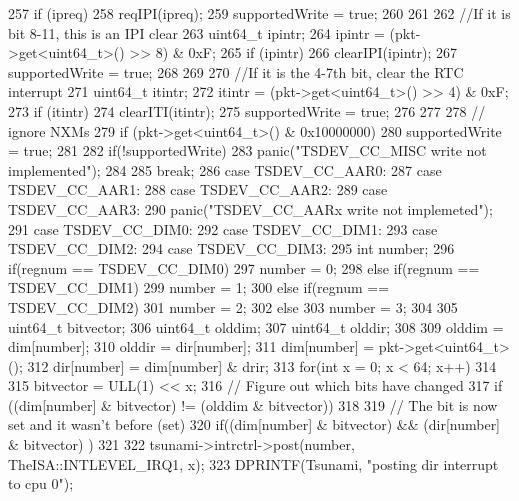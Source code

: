 \begin{DoxyCode}
{{{257             if (ipreq) {
258                 reqIPI(ipreq);
259                 supportedWrite = true;
260             }
261 
262             //If it is bit 8-11, this is an IPI clear
263             uint64_t ipintr;
264             ipintr = (pkt->get<uint64_t>() >> 8) & 0xF;
265             if (ipintr) {
266                 clearIPI(ipintr);
267                 supportedWrite = true;
268             }
269 
270             //If it is the 4-7th bit, clear the RTC interrupt
271             uint64_t itintr;
272               itintr = (pkt->get<uint64_t>() >> 4) & 0xF;
273             if (itintr) {
274                   clearITI(itintr);
275                 supportedWrite = true;
276             }
277 
278               // ignore NXMs
279               if (pkt->get<uint64_t>() & 0x10000000)
280                   supportedWrite = true;
281 
282             if(!supportedWrite)
283                   panic("TSDEV_CC_MISC write not implemented\n");
284 
285             break;
286             case TSDEV_CC_AAR0:
287             case TSDEV_CC_AAR1:
288             case TSDEV_CC_AAR2:
289             case TSDEV_CC_AAR3:
290                 panic("TSDEV_CC_AARx write not implemeted\n");
291             case TSDEV_CC_DIM0:
292             case TSDEV_CC_DIM1:
293             case TSDEV_CC_DIM2:
294             case TSDEV_CC_DIM3:
295                 int number;
296                 if(regnum == TSDEV_CC_DIM0)
297                     number = 0;
298                 else if(regnum == TSDEV_CC_DIM1)
299                     number = 1;
300                 else if(regnum == TSDEV_CC_DIM2)
301                     number = 2;
302                 else
303                     number = 3;
304 
305                 uint64_t bitvector;
306                 uint64_t olddim;
307                 uint64_t olddir;
308 
309                 olddim = dim[number];
310                 olddir = dir[number];
311                 dim[number] = pkt->get<uint64_t>();
312                 dir[number] = dim[number] & drir;
313                 for(int x = 0; x < 64; x++)
314                 {
315                     bitvector = ULL(1) << x;
316                     // Figure out which bits have changed
317                     if ((dim[number] & bitvector) != (olddim & bitvector))
318                     {
319                         // The bit is now set and it wasn't before (set)
320                         if((dim[number] & bitvector) && (dir[number] & bitvector)
      )
321                         {
322                           tsunami->intrctrl->post(number, TheISA::INTLEVEL_IRQ1, 
      x);
323                           DPRINTF(Tsunami, "posting dir interrupt to cpu 0\n");
}}}}}}
\end{DoxyCode}
